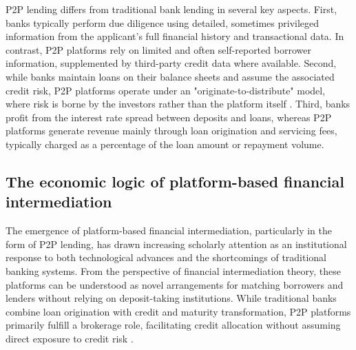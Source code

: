 \documentclass[pdflatex,sn-apa]{sn-jnl}%
\theoremstyle{thmstyleone}%
\theoremstyle{thmstyletwo}%
\theoremstyle{thmstylethree}%
\begin{document}
P2P lending differs from traditional bank lending in several key aspects. First, banks typically perform due diligence using detailed, sometimes privileged information from the applicant's full financial history and transactional data. In contrast, P2P platforms rely on limited and often self-reported borrower information, supplemented by third-party credit data where available. Second, while banks maintain loans on their balance sheets and assume the associated credit risk, P2P platforms operate under an "originate-to-distribute" model, where risk is borne by the investors rather than the platform itself \citep{freedman_information_2017, lin_judging_2013}. Third, banks profit from the interest rate spread between deposits and loans, whereas P2P platforms generate revenue mainly through loan origination and servicing fees, typically charged as a percentage of the loan amount or repayment volume.

\subsection{The economic logic of platform-based financial intermediation}
The emergence of platform-based financial intermediation, particularly in the form of P2P lending, has drawn increasing scholarly attention as an institutional response to both technological advances and the shortcomings of traditional banking systems. From the perspective of financial intermediation theory, these platforms can be understood as novel arrangements for matching borrowers and lenders without relying on deposit-taking institutions. While traditional banks combine loan origination with credit and maturity transformation, P2P platforms primarily fulfill a brokerage role, facilitating credit allocation without assuming direct exposure to credit risk \citep{Havrylchyk2018115, Dömötör2021391}.
\end{document}
